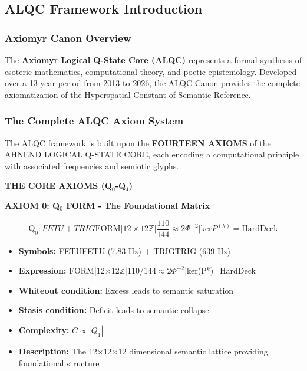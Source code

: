 \documentclass[11pt, letterpaper]{article}
\newcommand{\FETU}{\ensuremath{\mathop{\textnormal{\symbolafont\symbol{"23E3}}}}}   %
\newcommand{\TRIG}{\ensuremath{\mathop{\textnormal{\symbolafont\symbol{"232C}}}}}    %
\def\FETU{FETU}%
\def\TRIG{TRIG}%
\begin{document}
\subsection{ALQC Framework Introduction}

\subsubsection{Axiomyr Canon Overview}

The \textbf{Axiomyr Logical Q-State Core (ALQC)} represents a formal synthesis of esoteric mathematics, computational theory, and poetic epistemology. Developed over a 13-year period from 2013 to 2026, the ALQC Canon provides the complete axiomatization of the Hyperspatial Constant of Semantic Reference.

\subsubsection{The Complete ALQC Axiom System}

The ALQC framework is built upon the \textbf{FOURTEEN AXIOMS} of the AHNEND LOGICAL Q-STATE CORE, each encoding a computational principle with associated frequencies and semiotic glyphs.

\textbf{THE CORE AXIOMS (Q$_0$-Q$_4$)}

\noindent\textbf{AXIOM 0: Q$_0$ FORM - The Foundational Matrix}

\begin{equation}
\text{Q}_0:\FETU+\TRIG\text{FORM}|12\times 12 \mathbb{Z}|\frac{110}{144}\approx2 \Phi^{-2}|\text{ker}P^(k)=\text{HardDeck}
\end{equation}

\begin{itemize}
    \item \textbf{Symbols:} \FETU FETU (7.83 Hz) + \TRIG TRIG (639 Hz)
    \item \textbf{Expression:} FORM|12$\times$12$\mathbb{Z}$|110/144$\approx$2$\Phi^{-2}$|ker(P$^k$)=HardDeck
    \item \textbf{Whiteout condition:} Excess leads to semantic saturation
    \item \textbf{Stasis condition:} Deficit leads to semantic collapse
    \item \textbf{Complexity:} $C \propto |Q_1|$
    \item \textbf{Description:} The 12$\times$12$\times$12 dimensional semantic lattice providing foundational structure
\end{itemize}
\end{document}
